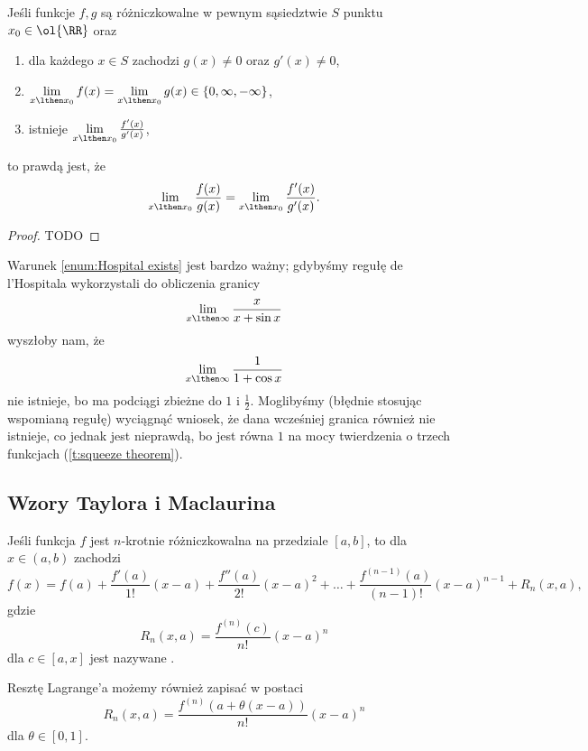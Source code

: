 \begin{theorem}
    \label{t:Hospital}
    Jeśli funkcje $f, g$ są różniczkowalne w pewnym sąsiedztwie $S$ punktu $x_0 \in \ol{\RR}$ oraz
    \begin{enumerate}
        \item dla każdego $x \in S$ zachodzi $g(x) \neq 0$ oraz $g'(x) \neq 0$,
        \item $\lim\limits_{x\lthen x_0} f(x) = \lim\limits_{x\lthen x_0} g(x) \in \{0, \infty, -\infty\}$,
        \item \label{enum:Hospital exists} istnieje $\lim\limits_{x\lthen x_0}\frac{f'(x)}{g'(x)}$,
    \end{enumerate}
    to prawdą jest, że
    \[ \lim_{x\lthen x_0}\frac{f(x)}{g(x)} = \lim_{x\lthen x_0}\frac{f'(x)}{g'(x)}. \]
\end{theorem}
\begin{proof}
    TODO
\end{proof}
\begin{remark}
    Warunek \ref{enum:Hospital exists} jest bardzo ważny; gdybyśmy regułę de l'Hospitala wykorzystali do obliczenia granicy
    \[ \lim_{x\lthen\infty}\frac{x}{x + \sin x} \]
    wyszłoby nam, że
    \[ \lim_{x\lthen\infty}\frac{1}{1 + \cos x} \]
    nie istnieje, bo ma podciągi zbieżne do $1$ i $\frac{1}{2}$. Moglibyśmy (błędnie stosując wspomianą regułę) wyciągnąć wniosek, że dana wcześniej granica również nie istnieje, co jednak jest nieprawdą, bo jest równa $1$ na mocy twierdzenia o trzech funkcjach (\ref{t:squeeze theorem}).
\end{remark}

\subsection{Wzory Taylora i Maclaurina}
\begin{theorem}[Taylora]
    \label{t:Taylor}
    Jeśli funkcja $f$ jest $n$-krotnie różniczkowalna na przedziale $[a, b]$, to dla $x \in (a, b)$ zachodzi
    \[ f(x) = f(a) + \frac{f'(a)}{1!}(x - a) + \frac{f''(a)}{2!}(x - a)^2 + \ldots + \frac{f^{(n-1)}(a)}{(n-1)!}(x - a)^{n-1} + R_n(x, a), \]
    gdzie
    \[ R_n(x, a) = \frac{f^{(n)}(c)}{n!}(x - a)^n \]
    dla $c \in [a, x]$ jest nazywane .
\end{theorem}

Resztę Lagrange'a możemy również zapisać w postaci
\[ R_n(x, a) = \frac{f^{(n)}(a + \theta(x - a))}{n!}(x - a)^n \]
dla $\theta \in [0, 1]$.

